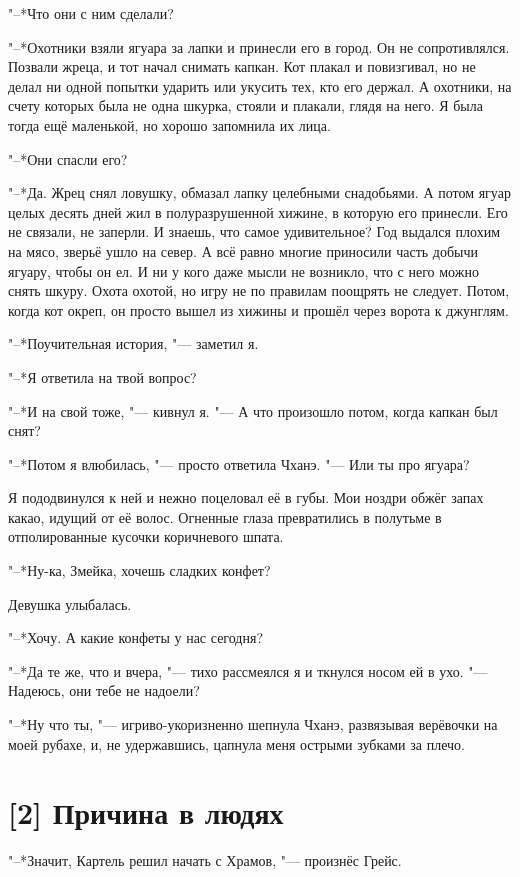 "--*Что они с ним сделали?

"--*Охотники взяли ягуара за лапки и принесли его в город.
Он не сопротивлялся.
Позвали жреца, и тот начал снимать капкан.
Кот плакал и повизгивал, но не делал ни одной попытки ударить или укусить тех, кто его держал.
А охотники, на счету которых была не одна шкурка, стояли и плакали, глядя на него.
Я была тогда ещё маленькой, но хорошо запомнила их лица.

"--*Они спасли его?

"--*Да.
Жрец снял ловушку, обмазал лапку целебными снадобьями.
А потом ягуар целых десять дней жил в полуразрушенной хижине, в которую его принесли.
Его не связали, не заперли.
И знаешь, что самое удивительное?
Год выдался плохим на мясо, зверьё ушло на север.
А всё равно многие приносили часть добычи ягуару, чтобы он ел.
И ни у кого даже мысли не возникло, что с него можно снять шкуру.
Охота охотой, но игру не по правилам поощрять не следует.
Потом, когда кот окреп, он просто вышел из хижины и прошёл через ворота к джунглям.

"--*Поучительная история, "--- заметил я.

"--*Я ответила на твой вопрос?

"--*И на свой тоже, "--- кивнул я.
"--- А что произошло потом, когда капкан был снят?

"--*Потом я влюбилась, "--- просто ответила Чханэ.
"--- Или ты про ягуара?

Я пододвинулся к ней и нежно поцеловал её в губы.
Мои ноздри обжёг запах какао, идущий от её волос.
Огненные глаза превратились в полутьме в отполированные кусочки коричневого шпата.

"--*Ну-ка, Змейка, хочешь сладких конфет?

Девушка улыбалась.

"--*Хочу.
А какие конфеты у нас сегодня?

"--*Да те же, что и вчера, "--- тихо рассмеялся я и ткнулся носом ей в ухо.
"--- Надеюсь, они тебе не надоели?

"--*Ну что ты, "--- игриво-укоризненно шепнула Чханэ, развязывая верёвочки на моей рубахе, и, не удержавшись, цапнула меня острыми зубками за плечо.

\section{[2] Причина в людях}

"--*Значит, Картель решил начать с Храмов, "--- произнёс Грейс.

